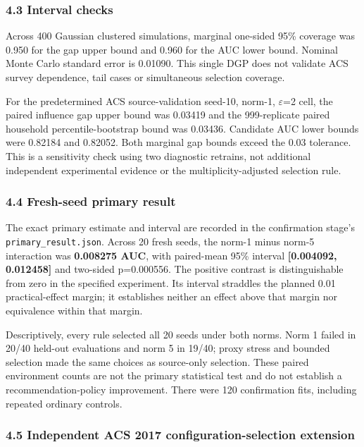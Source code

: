 \documentclass[
  10pt,
]{article}
\begin{document}
\hypertarget{interval-checks}{%
\subsubsection{4.3 Interval checks}\label{interval-checks}}

Across 400 Gaussian clustered simulations, marginal one-sided 95\%
coverage was 0.950 for the gap upper bound and 0.960 for the AUC lower
bound. Nominal Monte Carlo standard error is 0.01090. This single DGP
does not validate ACS survey dependence, tail cases or simultaneous
selection coverage.

For the predetermined ACS source-validation seed-10, norm-1,
\(\varepsilon\)=2 cell, the paired influence gap upper bound was 0.03419
and the 999-replicate paired household percentile-bootstrap bound was
0.03436. Candidate AUC lower bounds were 0.82184 and 0.82052. Both
marginal gap bounds exceed the 0.03 tolerance. This is a sensitivity
check using two diagnostic retrains, not additional independent
experimental evidence or the multiplicity-adjusted selection rule.

\hypertarget{fresh-seed-primary-result}{%
\subsubsection{4.4 Fresh-seed primary
result}\label{fresh-seed-primary-result}}

The exact primary estimate and interval are recorded in the confirmation
stage's \texttt{primary\_result.json}. Across 20 fresh seeds, the norm-1
minus norm-5 interaction was \textbf{0.008275 AUC}, with paired-mean
95\% interval \textbf{{[}0.004092, 0.012458{]}} and two-sided
p=0.000556. The positive contrast is distinguishable from zero in the
specified experiment. Its interval straddles the planned 0.01
practical-effect margin; it establishes neither an effect above that
margin nor equivalence within that margin.

Descriptively, every rule selected all 20 seeds under both norms. Norm 1
failed in 20/40 held-out evaluations and norm 5 in 19/40; proxy stress
and bounded selection made the same choices as source-only selection.
These paired environment counts are not the primary statistical test and
do not establish a recommendation-policy improvement. There were 120
confirmation fits, including repeated ordinary controls.

\hypertarget{independent-acs-2017-configuration-selection-extension}{%
\subsubsection{4.5 Independent ACS 2017 configuration-selection
extension}\label{independent-acs-2017-configuration-selection-extension}}
\end{document}
